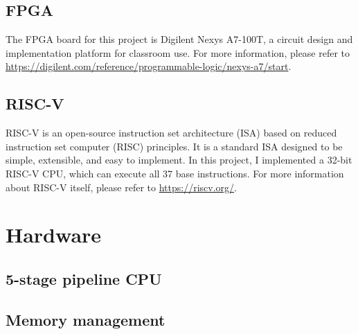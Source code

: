 \documentclass[12pt, a4paper, oneside]{article}
\begin{document}
\subsection{FPGA}
The FPGA board for this project is Digilent Nexys A7-100T, a circuit design and implementation platform for classroom use. For more information, please refer to \url{https://digilent.com/reference/programmable-logic/nexys-a7/start}.

\subsection{RISC-V}
RISC-V is an open-source instruction set architecture (ISA) based on reduced instruction set computer (RISC) principles. It is a standard ISA designed to be simple, extensible, and easy to implement. In this project, I implemented a 32-bit RISC-V CPU, which can execute all 37 base instructions. For more information about RISC-V itself, please refer to \url{https://riscv.org/}.
\section{Hardware}

\subsection{5-stage pipeline CPU}

\subsection{Memory management}
\end{document}
